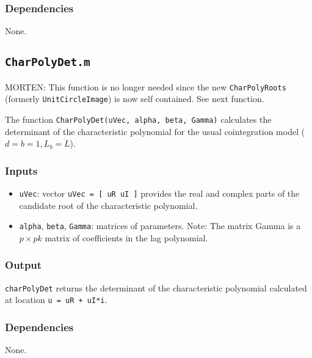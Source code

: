 \documentclass[12pt]{article}
\begin{document}
\subsubsection*{Dependencies}

None.





\newpage


\subsection{\texttt{CharPolyDet.m}}

MORTEN: This function is no longer needed since the new \texttt{CharPolyRoots} (formerly \texttt{UnitCircleImage}) is now self contained. See next function.

The function \texttt{CharPolyDet(uVec, alpha, beta, Gamma)} calculates the determinant of the characteristic polynomial for the usual cointegration model ($d = b = 1, L_b = L$). 

\subsubsection*{Inputs}

\begin{itemize}

\item \texttt{uVec}: vector \texttt{uVec = [ uR uI ]} provides the real and complex parts of
           the candidate root of the characteristic polynomial. 
\item  \texttt{alpha}, \texttt{beta}, \texttt{Gamma}: matrices of parameters. Note: The matrix Gamma is a $p \times pk$ matrix of coefficients in the lag polynomial.
   
\end{itemize}

\subsubsection*{Output}

\texttt{charPolyDet} returns the determinant of the characteristic polynomial calculated at location \texttt{u = uR + uI*\rm{i}}. 
 
\subsubsection*{Dependencies}

None.
\end{document}
